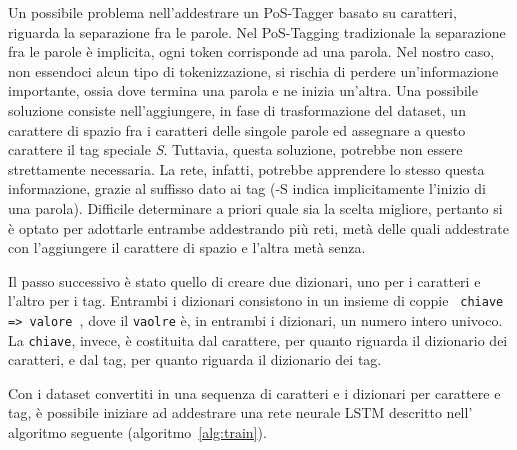 Un possibile problema nell'addestrare un PoS-Tagger basato su caratteri, riguarda
la separazione fra le parole. Nel PoS-Tagging tradizionale la separazione fra le
parole \`e implicita, ogni token corrisponde ad una parola. Nel nostro caso, non
essendoci alcun tipo di tokenizzazione, si rischia di perdere un'informazione
importante, ossia dove termina una parola e ne inizia un'altra. Una possibile
soluzione consiste nell'aggiungere, in fase di trasformazione del dataset, un
carattere di spazio fra i caratteri delle singole parole ed assegnare a questo
carattere il tag speciale \emph{S}. Tuttavia, questa soluzione, potrebbe non essere
strettamente necessaria. La rete, infatti, potrebbe apprendere lo stesso questa
informazione, grazie al suffisso dato ai tag (-S indica implicitamente l'inizio
di una parola). Difficile determinare a priori quale sia la scelta migliore,
pertanto si \`e optato per adottarle entrambe addestrando pi\`u reti, met\`a
delle quali addestrate con l'aggiungere il carattere di spazio e l'altra met\`a
senza.

Il passo successivo \`e stato quello di creare due dizionari, uno per i caratteri e
l'altro per i tag. Entrambi i dizionari consistono in un insieme di coppie \texttt{
chiave => valore }, dove il \texttt{vaolre} \`e, in entrambi i dizionari, un numero
intero univoco. La \texttt{chiave}, invece, \`e costituita dal carattere, per
quanto riguarda il dizionario dei caratteri, e dal tag, per quanto riguarda il
dizionario dei tag.

Con i dataset convertiti in una sequenza di caratteri e i dizionari per carattere
e tag, \`e possibile iniziare ad addestrare una rete neurale LSTM descritto nell'
algoritmo seguente (algoritmo~\ref{alg:train}).



